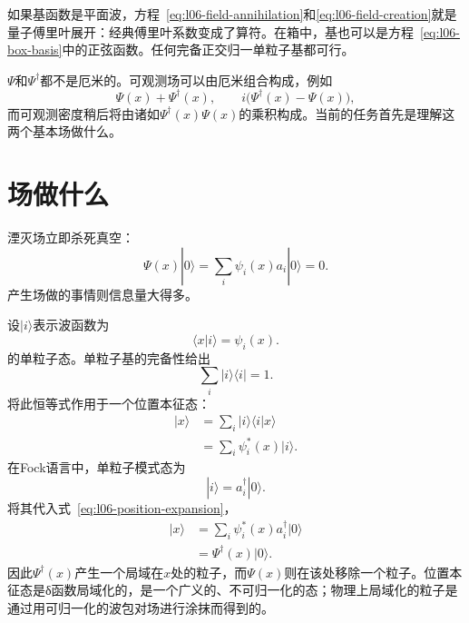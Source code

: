 如果基函数是平面波，方程~\eqref{eq:l06-field-annihilation}和\eqref{eq:l06-field-creation}就是量子傅里叶展开：经典傅里叶系数变成了算符。在箱中，基也可以是方程~\eqref{eq:l06-box-basis}中的正弦函数。任何完备正交归一单粒子基都可行。

\(\Psi\)和\(\Psi^\dagger\)都不是厄米的。可观测场可以由厄米组合构成，例如
\begin{equation}
\Psi(x)+\Psi^\dagger(x),
\qquad
i\bigl(\Psi^\dagger(x)-\Psi(x)\bigr),
\end{equation}
而可观测密度稍后将由诸如\(\Psi^\dagger(x)\Psi(x)\)的乘积构成。当前的任务首先是理解这两个基本场做什么。

\begin{classroomqa}
\end{classroomqa}

\section{场做什么}

湮灭场立即杀死真空：
\begin{equation}
\Psi(x)|0\rangle
=\sum_i\psi_i(x)a_i|0\rangle
=0.
\label{eq:l06-field-kills-vacuum}
\end{equation}
产生场做的事情则信息量大得多。

设\(|i\rangle\)表示波函数为
\begin{equation}
\langle x|i\rangle=\psi_i(x).
\end{equation}
的单粒子态。单粒子基的完备性给出
\begin{equation}
\sum_i|i\rangle\langle i|=1.
\label{eq:l06-completeness}
\end{equation}
将此恒等式作用于一个位置本征态：
\begin{align}
|x\rangle
&=\sum_i|i\rangle\langle i|x\rangle \\
&=\sum_i\psi_i^*(x)|i\rangle.
\label{eq:l06-position-expansion}
\end{align}
在Fock语言中，单粒子模式态为
\begin{equation}
|i\rangle=a_i^\dagger|0\rangle.
\end{equation}
将其代入式~\eqref{eq:l06-position-expansion}，
\begin{align}
|x\rangle
&=\sum_i\psi_i^*(x)a_i^\dagger|0\rangle \\
&=\Psi^\dagger(x)|0\rangle.
\label{eq:l06-local-creation}
\end{align}
因此\(\Psi^\dagger(x)\)产生一个局域在\(x\)处的粒子，而\(\Psi(x)\)则在该处移除一个粒子。位置本征态是{\proseunicodefont δ}函数局域化的，是一个广义的、不可归一化的态；物理上局域化的粒子是通过用可归一化的波包对场进行涂抹而得到的。

